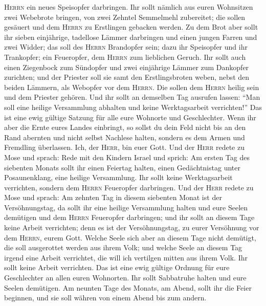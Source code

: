 \textsc{Herrn} ein neues Speisopfer darbringen.  Ihr
sollt nämlich aus euren Wohnsitzen zwei Webebrote bringen, von zwei
Zehntel Semmelmehl zubereitet; die sollen gesäuert und dem
\textsc{Herrn} zu Erstlingen gebacken werden.  Zu dem
Brot aber sollt ihr sieben einjährige, tadellose Lämmer darbringen und
einen jungen Farren und zwei Widder; das soll des \textsc{Herrn}
Brandopfer sein; dazu ihr Speisopfer und ihr Trankopfer; ein Feueropfer,
dem \textsc{Herrn} zum lieblichen Geruch.  Ihr sollt auch
einen Ziegenbock zum Sündopfer und zwei einjährige Lämmer zum Dankopfer
zurichten;  und der Priester soll sie samt den
Erstlingsbroten weben, nebst den beiden Lämmern, als Webopfer vor dem
\textsc{Herrn}. Die sollen dem \textsc{Herrn} heilig sein und dem
Priester gehören.  Und ihr sollt an demselben Tag
ausrufen lassen: ``Man soll eine heilige Versammlung abhalten und keine
Werktagsarbeit verrichten!'' Das ist eine ewig gültige Satzung für alle
eure Wohnorte und Geschlechter.  Wenn ihr aber die Ernte
eures Landes einbringt, so sollst du dein Feld nicht bis an den Rand
abernten und nicht selbst Nachlese halten, sondern es dem Armen und
Fremdling überlassen. Ich, der \textsc{Herr}, bin euer Gott.
 Und der \textsc{Herr} redete zu Mose und sprach:
 Rede mit den Kindern Israel und sprich: Am ersten Tag
des siebenten Monats sollt ihr einen Feiertag halten, einen
Gedächtnistag unter Posaunenklang, eine heilige Versammlung.
 Ihr sollt keine Werktagsarbeit verrichten, sondern dem
\textsc{Herrn} Feueropfer darbringen.  Und der
\textsc{Herr} redete zu Mose und sprach:  Am zehnten Tag
in diesem siebenten Monat ist der Versöhnungstag, da sollt ihr eine
heilige Versammlung halten und eure Seelen demütigen und dem
\textsc{Herrn} Feueropfer darbringen;  und ihr sollt an
diesem Tage keine Arbeit verrichten; denn es ist der Versöhnungstag, zu
eurer Versöhnung vor dem \textsc{Herrn}, eurem Gott. 
Welche Seele sich aber an diesem Tage nicht demütigt, die soll
ausgerottet werden aus ihrem Volk;  und welche Seele an
diesem Tag irgend eine Arbeit verrichtet, die will ich vertilgen mitten
aus ihrem Volk.  Ihr sollt keine Arbeit verrichten. Das
ist eine ewig gültige Ordnung für eure Geschlechter an allen euren
Wohnorten.  Ihr sollt Sabbatruhe halten und eure Seelen
demütigen. Am neunten Tage des Monats, am Abend, sollt ihr die Feier
beginnen, und sie soll währen von einem Abend bis zum andern.
